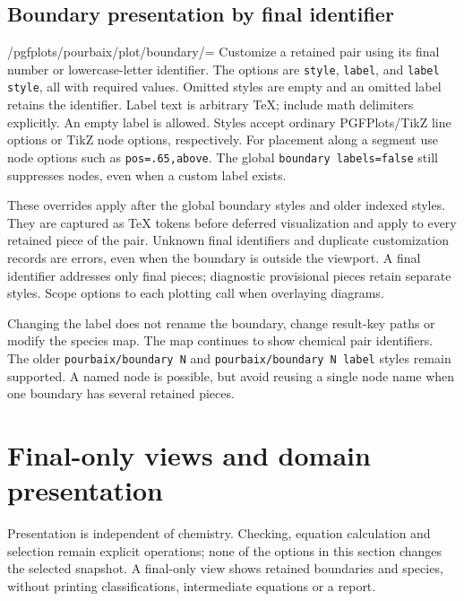 \documentclass[a4paper,11pt]{ltxdoc}
\begin{document}
\subsection{Boundary presentation by final identifier}
\begin{key}{/pgfplots/pourbaix/plot/boundary/=}
Customize a retained pair using its final number or lowercase-letter identifier.
The options are \texttt{style}, \texttt{label}, and \texttt{label style}, all with
required values. Omitted styles are empty and an omitted label retains the
identifier. Label text is arbitrary TeX; include math delimiters explicitly.
An empty label is allowed. Styles accept ordinary PGFPlots/TikZ line options or
TikZ node options, respectively. For placement along a segment use node options
such as \texttt{pos=.65,above}. The global \texttt{boundary labels=false} still
suppresses nodes, even when a custom label exists.

These overrides apply after the global boundary styles and older indexed styles.
They are captured as TeX tokens before deferred visualization and apply to every
retained piece of the pair. Unknown final identifiers and duplicate customization
records are errors, even when the boundary is outside the viewport. A final
identifier addresses only final pieces; diagnostic provisional pieces retain
separate styles. Scope options to each plotting call when overlaying diagrams.

Changing the label does not rename the boundary, change result-key paths or modify
the species map. The map continues to show chemical pair identifiers. The older
\texttt{pourbaix/boundary N} and \texttt{pourbaix/boundary N label} styles remain
supported. A named node is possible, but avoid reusing a single node name when
one boundary has several retained pieces.
\end{key}

\section{Final-only views and domain presentation}
\label{sec:appearance}
Presentation is independent of chemistry. Checking, equation calculation and
selection remain explicit operations; none of the options in this section changes
the selected snapshot. A final-only view shows retained boundaries and species,
without printing classifications, intermediate equations or a report.
\end{document}

